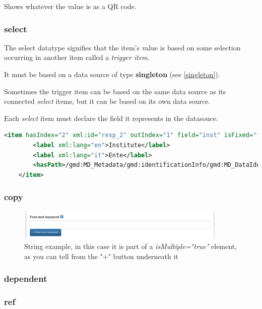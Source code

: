 \documentclass[10pt]{article}
\begin{document}
Shows whatever the value is as a QR code.


\subsubsection{select}
\label{select}

The select datatype signifies that the item's value is based on some selection occurring in another item called a \textit{trigger item}.

It must be based on a data source of type \textbf{singleton} (see \ref{singleton}).

Sometimes the trigger item can be based on the same data source as its connected \textit{select} items, but it can be based on its own data source.

Each \textit{select} item must declare the field it represents in the datasouce.

\begin{lstlisting}[language=xml]
	<item hasIndex="2" xml:id="resp_2" outIndex="1" field="inst" isFixed="false" hasDatatype="select" datasource="personS_2">
		<label xml:lang="en">Institute</label>
		<label xml:lang="it">Ente</label>
		<hasPath>/gmd:MD_Metadata/gmd:identificationInfo/gmd:MD_DataIdentification/gmd:citation/gmd:CI_Citation/gmd:citedResponsibleParty/gmd:CI_ResponsibleParty/gmd:organisationName/gco:CharacterString</hasPath>
	</item>
\end{lstlisting}

\subsubsection{copy}
\label{copy}

\begin{figure}[h]
	\caption{String example, in this case it is part of a \textit{isMultiple="true"} element, as you can tell from the "+" button underneath it}
	\includegraphics[width=10cm]{String.png}
	\centering
\end{figure}


\subsubsection{dependent}
\label{dependent}
\subsubsection{ref}
\label{ref}
\end{document}
